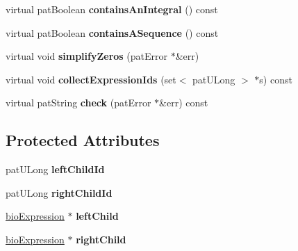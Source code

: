 \begin{DoxyCompactItemize}
\item 
\mbox{\label{classbio_arith_binary_expression_a60b22bf5aaf9e40bafe5fb3620006d4b}} 
virtual pat\+Boolean {\bfseries contains\+An\+Integral} () const
\item 
\mbox{\label{classbio_arith_binary_expression_af594a2a8aafaf291a615031972a9062c}} 
virtual pat\+Boolean {\bfseries contains\+A\+Sequence} () const
\item 
\mbox{\label{classbio_arith_binary_expression_a1e1560a60cb3ac6a94ae9e5fcbd3307b}} 
virtual void {\bfseries simplify\+Zeros} (pat\+Error $\ast$\&err)
\item 
\mbox{\label{classbio_arith_binary_expression_a8515e95f3de497ca7522ade60d24e308}} 
virtual void {\bfseries collect\+Expression\+Ids} (set$<$ pat\+U\+Long $>$ $\ast$s) const
\item 
\mbox{\label{classbio_arith_binary_expression_ad9179f665fac918f733a6d2181a7298d}} 
virtual pat\+String {\bfseries check} (pat\+Error $\ast$\&err) const
\end{DoxyCompactItemize}
\subsection*{Protected Attributes}
\begin{DoxyCompactItemize}
\item 
\mbox{\label{classbio_arith_binary_expression_a6fb23227582cda20c43541ce35767e2d}} 
pat\+U\+Long {\bfseries left\+Child\+Id}
\item 
\mbox{\label{classbio_arith_binary_expression_a62727cdbc8f6518c14e08eafc9965cab}} 
pat\+U\+Long {\bfseries right\+Child\+Id}
\item 
\mbox{\label{classbio_arith_binary_expression_a99815db34d52903224e468ef574e5869}} 
\hyperlink{classbio_expression}{bio\+Expression} $\ast$ {\bfseries left\+Child}
\item 
\mbox{\label{classbio_arith_binary_expression_a3b68601c3e004caa907c90dc07f41325}} 
\hyperlink{classbio_expression}{bio\+Expression} $\ast$ {\bfseries right\+Child}
\end{DoxyCompactItemize}


